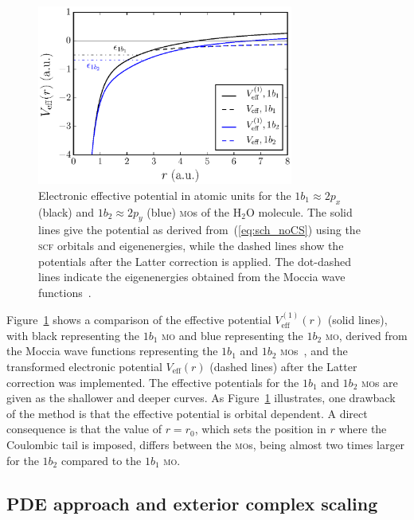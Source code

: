 \begin{figure}
  \centering
  \includegraphics[width=0.75\textwidth]{figures/ch_H2O/1b1_1b2/Veff1b11b2.eps}
  \caption{Electronic effective potential in atomic units for the
    $1b_{1}\approx 2p_{x}$ (black) and $1b_{2}\approx 2p_{y}$ (blue)
    \textsc{mo}s of the H$_{2}$O molecule. The solid lines give the
    potential as derived from~(\ref{eq:sch_noCS}) using the
    \textsc{scf} orbitals and eigenenergies, while the dashed lines
    show the potentials after the Latter correction is applied. The
    dot-dashed lines indicate the eigenenergies obtained from the
    Moccia wave functions~\cite{Moccia_1964}.}
  \label{fig:Veff1b11b2}
\end{figure}

Figure~\ref{fig:Veff1b11b2} shows a comparison of the effective
potential $V_{\mathrm{eff}}^{(1)}(r)$ (solid lines), with black
representing the $1b_{1}$ \textsc{mo} and blue representing the
$1b_{2}$ \textsc{mo}, derived from the Moccia wave functions
representing the $1b_{1}$ and $1b_{2}$
\textsc{mo}s~\cite{Moccia_1964}, and the transformed electronic
potential $V_{\mathrm{eff}}(r)$ (dashed lines) after the Latter
correction was implemented. The effective potentials for the $1b_{1}$
and $1b_{2}$ \textsc{mo}s are given as the shallower and deeper
curves. As Figure~\ref{fig:Veff1b11b2} illustrates, one drawback of
the method is that the effective potential is orbital dependent. A
direct consequence is that the value of $r=r_{0}$, which sets the
position in $r$ where the Coulombic tail is imposed, differs between
the \textsc{mo}s, being almost two times larger for the $1b_{2}$
compared to the $1b_{1}$ \textsc{mo}.


\subsection{PDE approach and exterior complex scaling}
\label{ch:ecs_1b11b2}

